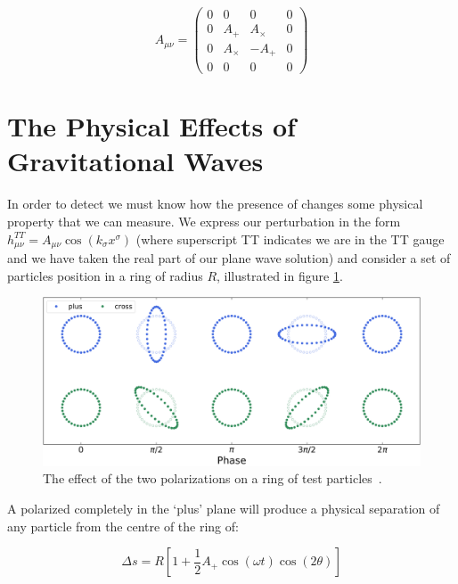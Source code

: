 \begin{equation}
   A_{\mu \nu} =
   \begin{pmatrix}
      0 & 0 & 0 & 0 \\
      0 & A_+ & A_\times & 0 \\
      0 & A_\times & -A_+ & 0 \\
      0 & 0 & 0 & 0
   \end{pmatrix}
   \label{eqn:A_mu_nu}
\end{equation}

\section{\label{sec:Mechanics}The Physical Effects of Gravitational Waves}

In order to detect \gws we must know how the presence of \gws changes some physical property that we can measure. We express our perturbation in the form $h_{\mu \nu}^{TT} = A_{\mu \nu} \cos(k_\sigma x^\sigma)$ (where superscript TT
indicates we are in the TT gauge and we have taken the real part of our plane wave solution) and consider a set of particles position in a ring of radius $R$, illustrated in figure \ref{fig:polarization}.

\begin{figure}
   \includegraphics[width=\textwidth]{images/gr_gw/polarization.png}
   \caption{\label{fig:polarization}The effect of the two polarizations on a ring of test particles~\cite{gw_polarization_plots}.}
\end{figure}

A \gw polarized completely in the `plus' plane will produce a physical separation of any particle from the centre of the ring of:

\begin{equation}
   \Delta s = R[1 + \frac{1}{2} A_+ \cos(\omega t) \cos(2 \theta)]
   \label{eqn:plus_separation}
\end{equation}

